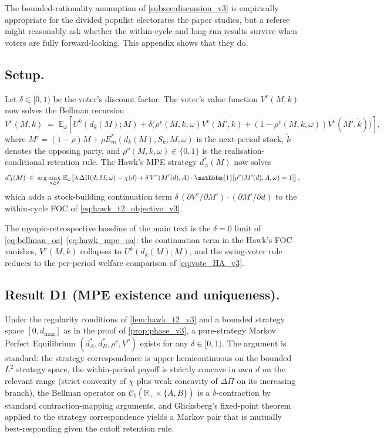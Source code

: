 \documentclass[11pt,twoside]{extarticle}
\begin{document}
The bounded-rationality assumption of \autoref{subsec:discussion_v3} is empirically appropriate for the divided populist electorates the paper studies, but a referee might reasonably ask whether the within-cycle and long-run results survive when voters are fully forward-looking. This appendix shows that they do.

\subsection*{Setup.} Let $\delta\in[0,1)$ be the voter's discount factor. The voter's value function $V^v(M,k)$ now solves the Bellman recursion
\begin{equation}\label{eq:bellman_oa}
    V^v(M,k)\;=\;\mathbb E_\omega\!\left[U^k(d_k(M);M)+\delta\big(\rho^v(M,k,\omega)V^v(M',k)+(1-\rho^v(M,k,\omega))V^v(M',\tilde k)\big)\right],
\end{equation}
where $M'=(1-\rho)M+\rho E_m^*(d_k(M),S_k;M,\omega)$ is the next-period stock, $\tilde k$ denotes the opposing party, and $\rho^v(M,k,\omega)\in\{0,1\}$ is the realisation-conditional retention rule. The Hawk's MPE strategy $d_A^*(M)$ now solves
\begin{equation}\label{eq:hawk_mpe_oa}
    d_A^*(M)\;\in\;\arg\max_{d\ge 0}\,\mathbb E_\omega\!\left[\lambda\,\Delta\Pi(d;M,\omega)-\chi(d)+\delta\,V^v(M'(d),A)\cdot\mathbbm{1}[\rho^v(M'(d),A,\omega)=1]\right],
\end{equation}
which adds a stock-building continuation term $\delta\,(\partial V^v/\partial M')\cdot(\partial M'/\partial d)$ to the within-cycle FOC of \autoref{eq:hawk_t2_objective_v3}.

The myopic-retrospective baseline of the main text is the $\delta=0$ limit of \autoref{eq:bellman_oa}--\autoref{eq:hawk_mpe_oa}: the continuation term in the Hawk's FOC vanishes, $V^v(M,k)$ collapses to $U^k(d_k(M);M)$, and the swing-voter rule reduces to the per-period welfare comparison of \autoref{eq:vote_HA_v3}.

\subsection*{Result D1 (MPE existence and uniqueness).} Under the regularity conditions of \autoref{lem:hawk_t2_v3} and a bounded strategy space $[0,d_{\max}]$ as in the proof of \autoref{prop:phase_v3}, a pure-strategy Markov Perfect Equilibrium $(d_A^*,d_B^*,\rho^v,V^v)$ exists for any $\delta\in[0,1)$. The argument is standard: the strategy correspondence is upper hemicontinuous on the bounded $L^2$ strategy space, the within-period payoff is strictly concave in own $d$ on the relevant range (strict convexity of $\chi$ plus weak concavity of $\Delta\Pi$ on its increasing branch), the Bellman operator on $\mathcal{C}_b(\mathbb R_+\times\{A,B\})$ is a $\delta$-contraction by standard contraction-mapping arguments, and Glicksberg's fixed-point theorem applied to the strategy correspondence yields a Markov pair that is mutually best-responding given the cutoff retention rule.
\end{document}
